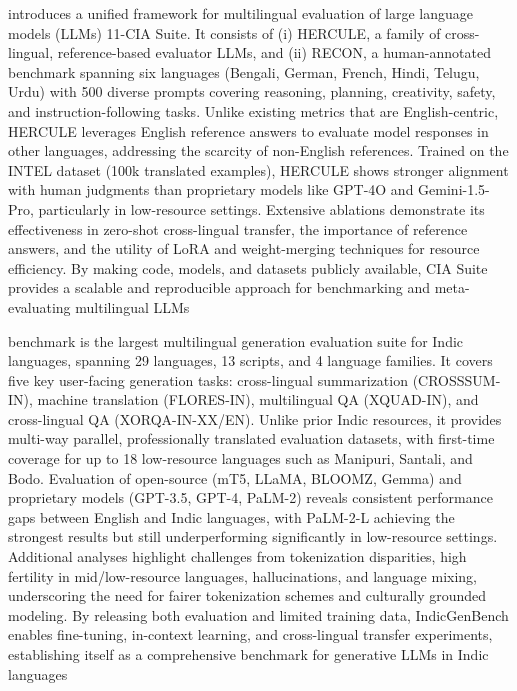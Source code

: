 \documentclass[acmsmall]{acmart}
\begin{document}
\citep{} introduces a unified framework for multilingual evaluation of large language models (LLMs)
11-CIA Suite. It consists of (i) HERCULE, a family of cross-lingual, reference-based evaluator LLMs, and (ii) RECON, a human-annotated benchmark spanning six languages (Bengali, German, French, Hindi, Telugu, Urdu) with 500 diverse prompts covering reasoning, planning, creativity, safety, and instruction-following tasks. Unlike existing metrics that are English-centric, HERCULE leverages English reference answers to evaluate model responses in other languages, addressing the scarcity of non-English references. Trained on the INTEL dataset (100k translated examples), HERCULE shows stronger alignment with human judgments than proprietary models like GPT-4O and Gemini-1.5-Pro, particularly in low-resource settings. Extensive ablations demonstrate its effectiveness in zero-shot cross-lingual transfer, the importance of reference answers, and the utility of LoRA and weight-merging techniques for resource efficiency. By making code, models, and datasets publicly available, CIA Suite provides a scalable and reproducible approach for benchmarking and meta-evaluating multilingual LLMs


\citep{singh2024indicgenbenchmultilingualbenchmarkevaluate} benchmark is the largest multilingual generation evaluation suite for Indic languages, spanning 29 languages, 13 scripts, and 4 language families. It covers five key user-facing generation tasks: cross-lingual summarization (CROSSSUM-IN), machine translation (FLORES-IN), multilingual QA (XQUAD-IN), and cross-lingual QA (XORQA-IN-XX/EN). Unlike prior Indic resources, it provides multi-way parallel, professionally translated evaluation datasets, with first-time coverage for up to 18 low-resource languages such as Manipuri, Santali, and Bodo. Evaluation of open-source (mT5, LLaMA, BLOOMZ, Gemma) and proprietary models (GPT-3.5, GPT-4, PaLM-2) reveals consistent performance gaps between English and Indic languages, with PaLM-2-L achieving the strongest results but still underperforming significantly in low-resource settings. Additional analyses highlight challenges from tokenization disparities, high fertility in mid/low-resource languages, hallucinations, and language mixing, underscoring the need for fairer tokenization schemes and culturally grounded modeling. By releasing both evaluation and limited training data, IndicGenBench enables fine-tuning, in-context learning, and cross-lingual transfer experiments, establishing itself as a comprehensive benchmark for generative LLMs in Indic languages
\end{document}
